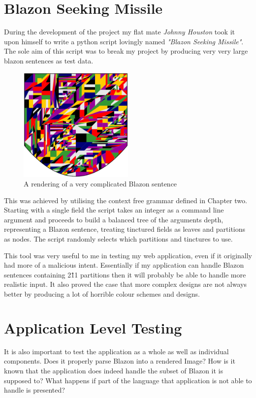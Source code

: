 \section{Blazon Seeking Missile} 

During the development of the project my flat mate \emph{Johnny Houston} took it upon himself to write a python script lovingly named \emph{"Blazon Seeking Missile"}.  The sole aim of this script was to break my project by producing very very large blazon sentences as test data.  


\begin{figure}[H]
  \centering
    \includegraphics[width=0.5\textwidth]{testing/images/bigmess.eps}
  \caption{A rendering of a very complicated Blazon sentence}
  
\end{figure}


This was achieved by utilising the context free grammar defined in Chapter two.  Starting with a single field the script takes an integer as a command line argument and proceeds to build a balanced tree of the arguments depth, representing a Blazon sentence, treating tinctured fields as leaves and partitions as nodes.   The script randomly selects which partitions and tinctures to use.  

This tool was very useful to me in testing my web application, even if it originally had more of a malicious intent.  Essentially if my application can handle Blazon sentences containing 2\^11 partitions then it will probably be able to handle more realistic input.  It also proved the case that more complex designs are not always better by producing a lot of horrible colour schemes and designs.  


\section{Application Level Testing}
It is also important to test the application as a whole as well as individual components.  Does it properly parse Blazon into a rendered Image?  How is it known that the application does indeed handle the subset of Blazon it is supposed to?   What happens if part of the language that application is not able to handle is presented? 


